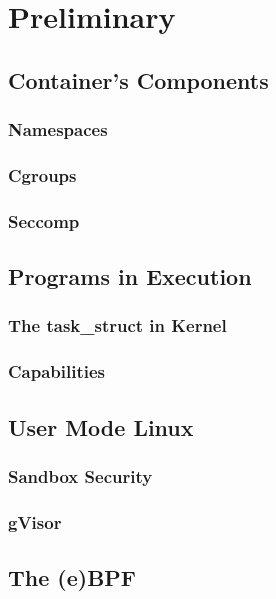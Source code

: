 \chapter{Preliminary}

\section{Container's Components}
\subsection{Namespaces}
\subsection{Cgroups}
\subsection{Seccomp}

\section{Programs in Execution}
\subsection{The task\_struct in Kernel}
\subsection{Capabilities}

\section{User Mode Linux}
\subsection{Sandbox Security}
\subsection{gVisor}

\section{The (e)BPF}
